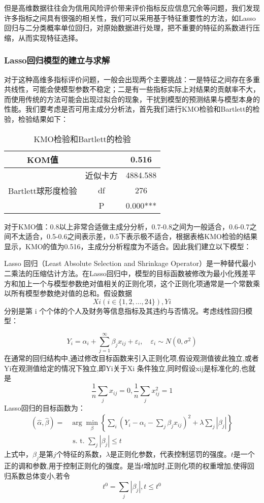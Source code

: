 \documentclass[12pt,a4paper]{nmmcm}
\begin{document}
但是高维数据往往会为信用风险评价带来评价指标反应信息冗余等问题，我们发现许多指标之间具有很强的相关性，我们可以采用基于特征重要性的方法，如Lasso回归与二分类概率单位回归，对原始数据进行处理，把不重要的特征的系数进行压缩，从而实现特征选择。
\subsubsection{Lasso回归模型的建立与求解}
对于这种高维多指标评价问题，一般会出现两个主要挑战：一是特征之间存在多重共线性，可能会使模型参数不稳定；二是有一些指标实际上对结果的贡献率不大，而使用传统的方法可能会出现过拟合的现象，干扰到模型的预测结果与模型本身的性能。我们要考虑是否可用主成分分析法，首先我们进行KMO检验和Bartlett的检验，检验结果如下：

\begin{table}[ht]
\centering
\caption{KMO检验和Bartlett的检验}
\label{tab:adf_results}
\begin{tabular}{ccc}
\hline
KOM值& &0.516\\
\hline
 &近似卡方&4884.588\\
Bartlett球形度检验&df&276\\
 &P&0.000***\\
 \hline
\end{tabular}
\smallskip
\end{table}

 对于KMO值：0.8以上非常合适做主成分分析，0.7-0.8之间为一般适合，0.6-0.7之间不太适合，0.5-0.6之间表示差，0.5下表示极不适合，根据表格KMO检验的结果显示，KMO的值为0.516，主成分分析程度为不适合。因此我们建立以下模型：

 Lasso 回归（Least Absolute Selection and Shrinkage Operator）是一种替代最小二乘法的压缩估计方法。在Lasso回归中，模型的目标函数被修改为最小化残差平方和加上一个与模型参数绝对值相关的正则化项，这个正则化项通常是一个常数乘以所有模型参数绝对值的总和。假设数据 \[X{i}  (i \in \{1, 2, \ldots, 24\}),Y{i}\]分别是第 i 个个体的个人及财务等信息指标及其违约与否情况。考虑线性回归模型：

$$
Y_i=\alpha_i+\sum_{j=1}^{\infty} \beta_j x_{i j}+\varepsilon_i, \quad \varepsilon_i \sim N\left(0, \sigma^2\right)
$$
在通常的回归结构中,通过修改目标函数来引入正则化项,假设观测值彼此独立,或者Yi在观测值给定的情况下独立,即Yi关于Xi 条件独立,同时假设xij是标准化的,也就是
\begin{equation}
\frac{1}{n} \sum_j x_{i j}=0, \frac{1}{n} \sum_j x_{i j}^2=1
\end{equation}
Lasso回归的目标函数为：
\begin{equation}
\begin{aligned}
(\hat{\alpha}, \hat{\beta})= & \arg \min _\beta\left\{\sum_i\left(Y_i-\alpha_i-\sum_j \beta_j x_{i j}\right)^2 + \lambda \sum\limits_j {|{\beta _j}|} \right\} \\
& \text { s. t. } \sum_j\left|\beta_j\right| \leqslant t
\end{aligned}
\end{equation}
上式中，$\beta_{j}$是第$j$个特征的系数，$\lambda$是正则化参数，代表控制惩罚的强度。$t$是一个正的调和参数,用于控制正则化的强度。是当$t$增加时,正则化项的权重增加,使得回归系数总体变小,若令\begin{equation}
t^0=\sum_j\left|\beta_j\right|, t \leqslant t^0
\end{equation}
\end{document}
